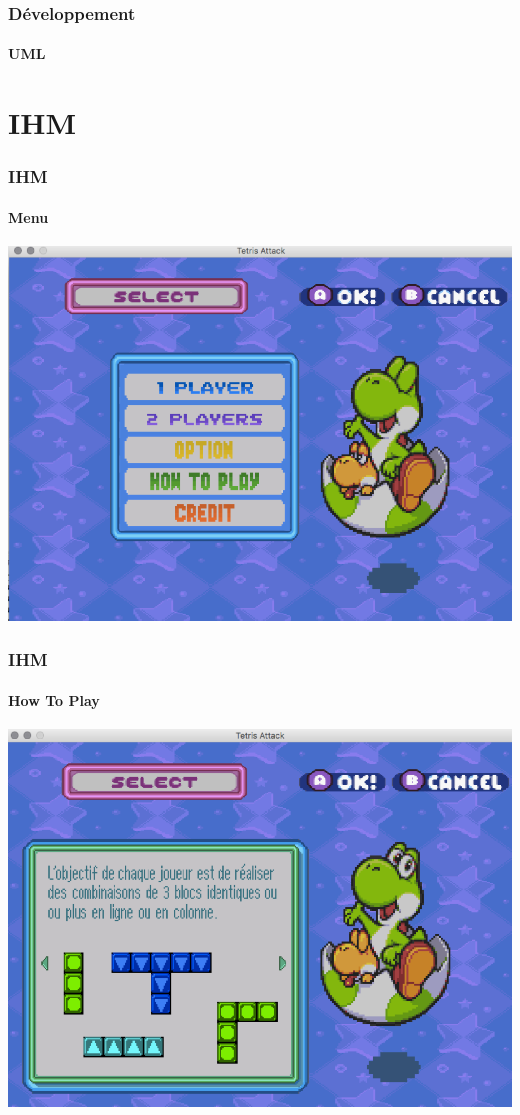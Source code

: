 \documentclass{beamer}
\begin{document}
\begin{darkframes}
     \begin{frame}
 	 \frametitle{Développement}
 	 \begin{center}
 	 \framesubtitle{UML}
		
		\end{center}
    \end{frame}
  
   \section{IHM}
 \begin{frame}
 	 \frametitle{IHM}
 	 \begin{center}
 	 \framesubtitle{Menu}
		\includegraphics[scale=0.40]{./Image/menu.png}
		\end{center}
    \end{frame}
    
     \begin{frame}
 	 \frametitle{IHM}
 	 \begin{center}
 	 \framesubtitle{How To Play}
		\includegraphics[scale=0.40]{./Image/howtoplay.png}
		\end{center}
    \end{frame}
    

\end{darkframes}
\end{document}
